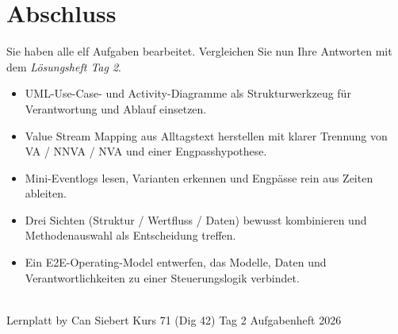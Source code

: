 \documentclass[11pt,a4paper,oneside]{article}
\begin{document}
\clearpage

\section*{Abschluss}
\thispagestyle{plain}

\noindent Sie haben alle elf Aufgaben bearbeitet. Vergleichen Sie nun Ihre Antworten mit dem \emph{L\"osungsheft Tag 2}.

\medskip
\begin{infobox}
\begin{itemize}
  \item UML-Use-Case- und Activity-Diagramme als Strukturwerkzeug f\"ur Verantwortung und Ablauf einsetzen.
  \item Value Stream Mapping aus Alltagstext herstellen \textendash{} mit klarer Trennung von VA / NNVA / NVA und einer Engpasshypothese.
  \item Mini-Eventlogs lesen, Varianten erkennen und Engp\"asse rein aus Zeiten ableiten.
  \item Drei Sichten (Struktur / Wertfluss / Daten) bewusst kombinieren \textendash{} und Methodenauswahl als Entscheidung treffen.
  \item Ein E2E-Operating-Model entwerfen, das Modelle, Daten und Verantwortlichkeiten zu einer Steuerungslogik verbindet.
\end{itemize}
\end{infobox}

\vspace{1cm}
\noindent{\color{lpAccent}\rule{\linewidth}{0.6pt}}\\[4pt]
{\footnotesize\sffamily\color{lpGray}Lernplatt \textperiodcentered{} by Can Siebert \textperiodcentered{} Kurs 71 (Dig 42) \textperiodcentered{} Tag 2 \textperiodcentered{} Aufgabenheft \textperiodcentered{} \textcopyright{} 2026}
\end{document}
